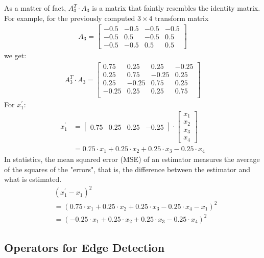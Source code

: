 \documentclass[a4paper,twocolumn]{article}
\begin{document}
	As a matter of fact, $A_3^T \cdot A_3$ is a matrix that faintly resembles the identity matrix. For example, for the previously computed $3 \times 4$ transform matrix
	\begin{align*}
	A_3 =
	\begin{bmatrix}
	-0.5 & -0.5 & -0.5 & -0.5 \\
	-0.5 & 0.5 & -0.5 & 0.5 \\
	-0.5 & -0.5 & 0.5 & 0.5
	\end{bmatrix}
	\end{align*}
	we get:
	\begin{align*}
	A_3^T \cdot A_3 =
	\begin{bmatrix}
	0.75 & 0.25 & 0.25 & -0.25 \\
	0.25 & 0.75 & -0.25 & 0.25 \\
	0.25 & -0.25 & 0.75 & 0.25 \\
	-0.25 & 0.25 & 0.25 & 0.75 \\
	\end{bmatrix}
	\end{align*}
	For $x_1^{\prime}$:
	\begin{align*}
	x_1^{\prime} &=
	\begin{bmatrix}
	0.75 & 0.25 & 0.25 & -0.25
	\end{bmatrix}
	\cdot
	\begin{bmatrix}
	x_1 \\ x_2 \\ x_3 \\ x_4
	\end{bmatrix} \\
	&= 0.75 \cdot x_1 + 0.25 \cdot x_2 + 0.25 \cdot x_3 - 0.25 \cdot x_4
	\end{align*}
	In statistics, the mean squared error (MSE) of an estimator measures the average of the squares of the "errors", that is, the difference between the estimator and what is estimated. 
	\begin{align*}
	&(x_1^{\prime} - x_1)^2 \\
	&= (0.75 \cdot x_1 + 0.25 \cdot x_2 + 0.25 \cdot x_3 - 0.25 \cdot x_4 - x_1)^2 \\
	&= (-0.25 \cdot x_1 + 0.25 \cdot x_2 + 0.25 \cdot x_3 - 0.25 \cdot x_4)^2
	\end{align*}
	
	\subsection{Operators for Edge Detection}
	
\end{document}
